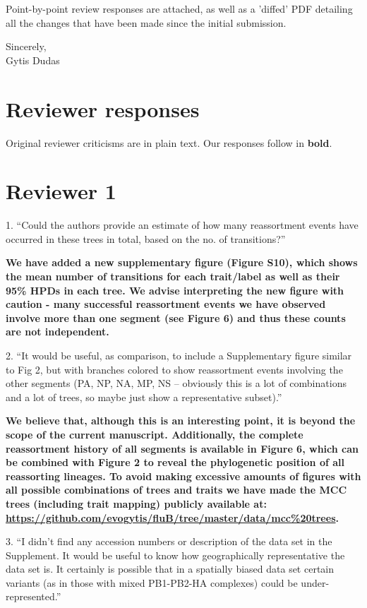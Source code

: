 \documentclass[11pt,oneside,letterpaper]{article}
\begin{document}
Point-by-point review responses are attached, as well as a 'diffed' PDF detailing all the changes that have been made since the initial submission.

Sincerely,\\
Gytis Dudas

\restoregeometry

\newpage

\section*{Reviewer responses}

Original reviewer criticisms are in plain text.  Our responses follow in \textbf{bold}.  

\section*{Reviewer 1}
1. ``Could the authors provide an estimate of how many reassortment events have occurred in these trees in total, based on the no. of transitions?''

\textbf{We have added a new supplementary figure (Figure S10), which shows the mean number of transitions for each trait/label as well as their 95\% HPDs in each tree.
We advise interpreting the new figure with caution - many successful reassortment events we have observed involve more than one segment (see Figure 6) and thus these counts are not independent.}

2. ``It would be useful, as comparison, to include a Supplementary figure similar to Fig 2, but with branches colored to show reassortment events involving the other segments (PA, NP, NA, MP, NS -- obviously this is a lot of combinations and a lot of trees, so maybe just show a representative subset).''

\textbf{We believe that, although this is an interesting point, it is beyond the scope of the current manuscript.
Additionally, the complete reassortment history of all segments is available in Figure 6, which can be combined with Figure 2 to reveal the phylogenetic position of all reassorting lineages.
To avoid making excessive amounts of figures with all possible combinations of trees and traits we have made the MCC trees (including trait mapping) publicly available at: \url{https://github.com/evogytis/fluB/tree/master/data/mcc\%20trees}.}

3. ``I didn't find any accession numbers or description of the data set in the Supplement.  
It would be useful to know how geographically representative the data set is.  
It certainly is possible that in a spatially biased data set certain variants (as in those with mixed PB1-PB2-HA complexes) could be under-represented.''
\end{document}
